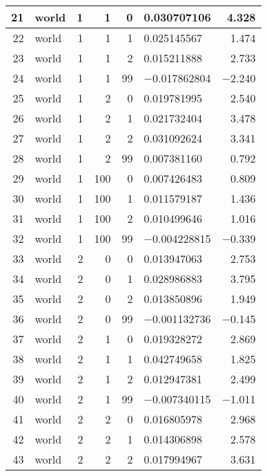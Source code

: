 \begin{longtable}{|r|l|r|r|r|l|r|}
   21 &    world &    1 &    1 &    0 &    0.030707106 &    4.328\\\hline
   22 &    world &    1 &    1 &    1 &    0.025145567 &    1.474\\\hline
   23 &    world &    1 &    1 &    2 &    0.015211888 &    2.733\\\hline
   24 &    world &    1 &    1 &    99 &    $-$0.017862804 &    $-$2.240\\\hline
   25 &    world &    1 &    2 &    0 &    0.019781995 &    2.540\\\hline
   26 &    world &    1 &    2 &    1 &    0.021732404 &    3.478\\\hline
   27 &    world &    1 &    2 &    2 &    0.031092624 &    3.341\\\hline
   28 &    world &    1 &    2 &    99 &    0.007381160 &    0.792\\\hline
   29 &    world &    1 &    100 &    0 &    0.007426483 &    0.809\\\hline
   30 &    world &    1 &    100 &    1 &    0.011579187 &    1.436\\\hline
   31 &    world &    1 &    100 &    2 &    0.010499646 &    1.016\\\hline
   32 &    world &    1 &    100 &    99 &    $-$0.004228815 &    $-$0.339\\\hline
   33 &    world &    2 &    0 &    0 &    0.013947063 &    2.753\\\hline
   34 &    world &    2 &    0 &    1 &    0.028986883 &    3.795\\\hline
   35 &    world &    2 &    0 &    2 &    0.013850896 &    1.949\\\hline
   36 &    world &    2 &    0 &    99 &    $-$0.001132736 &    $-$0.145\\\hline
   37 &    world &    2 &    1 &    0 &    0.019328272 &    2.869\\\hline
   38 &    world &    2 &    1 &    1 &    0.042749658 &    1.825\\\hline
   39 &    world &    2 &    1 &    2 &    0.012947381 &    2.499\\\hline
   40 &    world &    2 &    1 &    99 &    $-$0.007340115 &    $-$1.011\\\hline
   41 &    world &    2 &    2 &    0 &    0.016805978 &    2.968\\\hline
   42 &    world &    2 &    2 &    1 &    0.014306898 &    2.578\\\hline
   43 &    world &    2 &    2 &    2 &    0.017994967 &    3.631\\\hline

\end{longtable}
